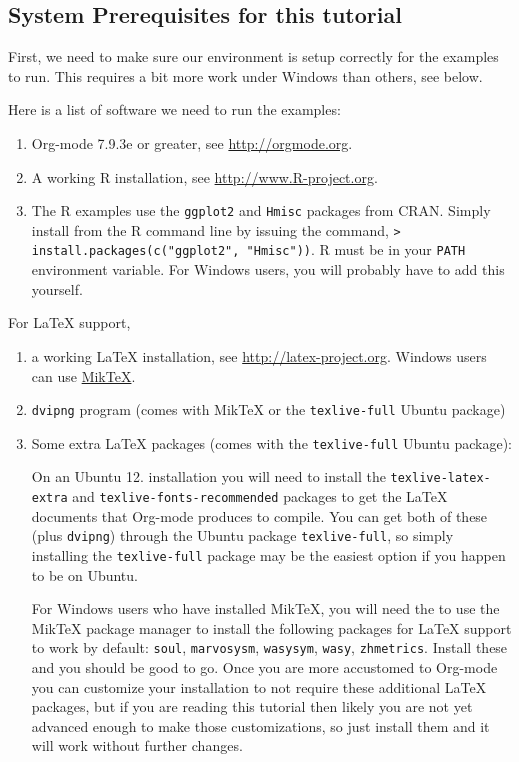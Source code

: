 \documentclass[11pt]{article}
\begin{document}
\subsection*{System Prerequisites for this tutorial}
\label{sec-1-1}

First, we need to make sure our environment is setup correctly for the examples to run.  This requires a bit more work under Windows than others, see below.

Here is a list of software we need to run the examples:
\begin{enumerate}
\item Org-mode 7.9.3e or greater, see \url{http://orgmode.org}.
\item A working R installation, see \url{http://www.R-project.org}.
\item The R examples use the \texttt{ggplot2} and \texttt{Hmisc} packages from CRAN. Simply install from the R command line by issuing the command, \texttt{> install.packages(c("ggplot2", "Hmisc"))}. R must be in your \texttt{PATH} environment variable.  For Windows users, you will probably have to add this yourself.
\end{enumerate}

For \LaTeX{} support, 
\begin{enumerate}
\item a working \LaTeX{} installation, see \url{http://latex-project.org}. Windows users can use \href{http://miktex.org/}{MikTeX}.
\item \texttt{dvipng} program (comes with MikTeX or the \texttt{texlive-full} Ubuntu package)
\item Some extra \LaTeX{} packages (comes with the \texttt{texlive-full} Ubuntu package): 

On an Ubuntu 12. installation you will need to install the \texttt{texlive-latex-extra} and \texttt{texlive-fonts-recommended} packages to get the \LaTeX{} documents that Org-mode produces to compile. You can get both of these (plus \texttt{dvipng}) through the Ubuntu package \texttt{texlive-full}, so simply installing the \texttt{texlive-full} package may be the easiest option if you happen to be on Ubuntu.

For Windows users who have installed MikTeX, you will need the to use the MikTeX package manager to install the following packages for \LaTeX{} support to work by default: \texttt{soul}, \texttt{marvosysm}, \texttt{wasysym}, \texttt{wasy}, \texttt{zhmetrics}. Install these and you should be good to go. Once you are more accustomed to Org-mode you can customize your installation to not require these additional \LaTeX{} packages, but if you are reading this tutorial then likely you are not yet advanced enough to make those customizations, so just install them and it will work without further changes.
\end{enumerate}
\end{document}
